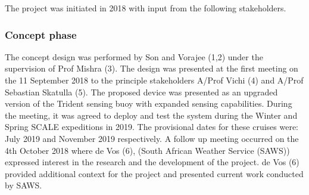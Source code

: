 The project was initiated in 2018 with input from the following stakeholders.
\begin{table}[H]
    \centering
    \caption{Legend showing the key stakeholders in the initiation of the project as discussed in the phases below. Legend includes name, reference number and department/institution. }
    \label{tab:proj_init_members}

\end{table}

\subsubsection{Concept phase}

The concept design was performed by Son and Vorajee (1,2) under the supervision of Prof Mishra (3). The design was presented at the first meeting on the 11 September 2018 to the principle stakeholders A/Prof Vichi (4) and A/Prof Sebastian Skatulla (5). The proposed device was presented as an upgraded version of the Trident sensing buoy with expanded sensing capabilities. During the meeting, it was agreed to deploy and test the system during the Winter and Spring SCALE expeditions in 2019. The provisional dates for these cruises were: July 2019 and November 2019 respectively. A follow up meeting occurred on the 4th October 2018 where de Vos (6), (South African Weather Service (SAWS)) expressed interest in the research and the development of the project. de Vos (6) provided additional context for the project and presented current work conducted by SAWS.

